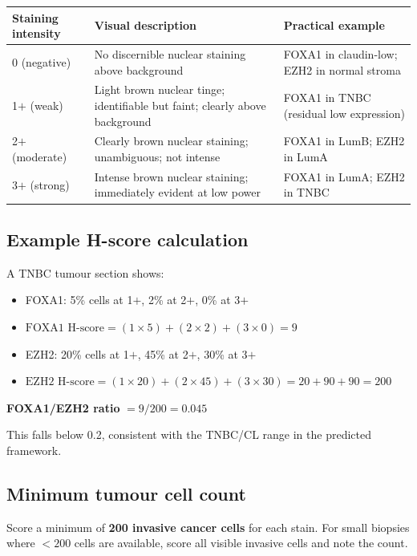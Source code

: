 \documentclass[11pt, a4paper]{article}
\begin{document}
\begin{center}
\begin{tabular}{p{3cm}p{5cm}p{5cm}}
\toprule
\textbf{Staining
intensity} &
\textbf{Visual description} &
\textbf{Practical example} \\
\midrule
0 (negative) &
No discernible nuclear staining
above background &
FOXA1 in claudin-low; EZH2 in
normal stroma \\[0.3em]
1$+$ (weak) &
Light brown nuclear tinge;
identifiable but faint;
clearly above background &
FOXA1 in TNBC (residual low
expression) \\[0.3em]
2$+$ (moderate) &
Clearly brown nuclear staining;
unambiguous; not intense &
FOXA1 in LumB; EZH2 in LumA \\[0.3em]
3$+$ (strong) &
Intense brown nuclear staining;
immediately evident at low power &
FOXA1 in LumA; EZH2 in TNBC \\
\bottomrule
\end{tabular}
\end{center}

\subsection{Example H-score calculation}

A TNBC tumour section shows:
\begin{itemize}
    \item FOXA1: 5\% cells at 1$+$, 2\% at 2$+$,
    0\% at 3$+$
    \item $\text{FOXA1 H-score} = (1 \times 5) +
    (2 \times 2) + (3 \times 0) = 9$
\end{itemize}
\begin{itemize}
    \item EZH2: 20\% cells at 1$+$, 45\% at 2$+$,
    30\% at 3$+$
    \item $\text{EZH2 H-score} = (1 \times 20) +
    (2 \times 45) + (3 \times 30) = 20 + 90 + 90 = 200$
\end{itemize}

\textbf{FOXA1/EZH2 ratio} $= 9 / 200 = 0.045$

This falls below 0.2, consistent with the
TNBC/CL range in the predicted framework.

\subsection{Minimum tumour cell count}

Score a minimum of \textbf{200 invasive cancer
cells} for each stain. For small biopsies where
$<200$ cells are available, score all visible
invasive cells and note the count.
\end{document}
